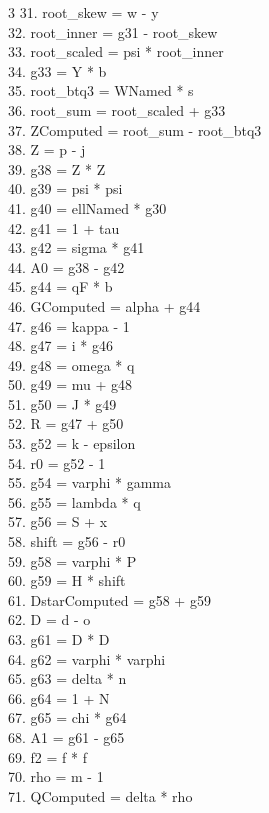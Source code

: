 \documentclass[10pt]{article}
\begin{document}
\begin{multicols}{3}
31. root\_skew = w - y\\
32. root\_inner = g31 - root\_skew\\
33. root\_scaled = psi * root\_inner\\
34. g33 = Y * b\\
35. root\_btq3 = WNamed * s\\
36. root\_sum = root\_scaled + g33\\
37. ZComputed = root\_sum - root\_btq3\\
38. Z = p - j\\
39. g38 = Z * Z\\
40. g39 = psi * psi\\
41. g40 = ellNamed * g30\\
42. g41 = 1 + tau\\
43. g42 = sigma * g41\\
44. A0 = g38 - g42\\
45. g44 = qF * b\\
46. GComputed = alpha + g44\\
47. g46 = kappa - 1\\
48. g47 = i * g46\\
49. g48 = omega * q\\
50. g49 = mu + g48\\
51. g50 = J * g49\\
52. R = g47 + g50\\
53. g52 = k - epsilon\\
54. r0 = g52 - 1\\
55. g54 = varphi * gamma\\
56. g55 = lambda * q\\
57. g56 = S + x\\
58. shift = g56 - r0\\
59. g58 = varphi * P\\
60. g59 = H * shift\\
61. DstarComputed = g58 + g59\\
62. D = d - o\\
63. g61 = D * D\\
64. g62 = varphi * varphi\\
65. g63 = delta * n\\
66. g64 = 1 + N\\
67. g65 = chi * g64\\
68. A1 = g61 - g65\\
69. f2 = f * f\\
70. rho = m - 1\\
71. QComputed = delta * rho\\

\end{multicols}
\end{document}
